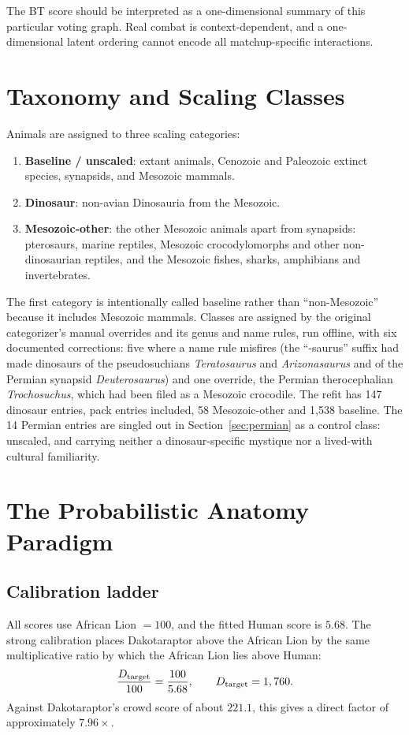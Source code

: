 \documentclass[11pt]{article}
\begin{document}
The BT score should be interpreted as a one-dimensional summary of this particular voting graph. Real combat is context-dependent, and a one-dimensional latent ordering cannot encode all matchup-specific interactions.

\section{Taxonomy and Scaling Classes}
\label{sec:classify}

Animals are assigned to three scaling categories:
\begin{enumerate}
\item \textbf{Baseline / unscaled}: extant animals, Cenozoic and Paleozoic extinct species, synapsids, and Mesozoic mammals.
\item \textbf{Dinosaur}: non-avian Dinosauria from the Mesozoic.
\item \textbf{Mesozoic-other}: the other Mesozoic animals apart from synapsids: pterosaurs, marine reptiles, Mesozoic crocodylomorphs and other non-dinosaurian reptiles, and the Mesozoic fishes, sharks, amphibians and invertebrates.
\end{enumerate}
The first category is intentionally called baseline rather than ``non-Mesozoic'' because it includes Mesozoic mammals. Classes are assigned by the original categorizer's manual overrides and its genus and name rules, run offline, with six documented corrections: five where a name rule misfires (the ``-saurus'' suffix had made dinosaurs of the pseudosuchians \textit{Teratosaurus} and \textit{Arizonasaurus} and of the Permian synapsid \textit{Deuterosaurus}) and one override, the Permian therocephalian \textit{Trochosuchus}, which had been filed as a Mesozoic crocodile. The refit has 147 dinosaur entries, pack entries included, 58 Mesozoic-other and 1,538 baseline. The 14 Permian entries are singled out in Section~\ref{sec:permian} as a control class: unscaled, and carrying neither a dinosaur-specific mystique nor a lived-with cultural familiarity.

\section{The Probabilistic Anatomy Paradigm}
\label{sec:rescale}

\subsection{Calibration ladder}
All scores use African Lion $=100$, and the fitted Human score is $5.68$. The strong calibration places Dakotaraptor above the African Lion by the same multiplicative ratio by which the African Lion lies above Human:
\[
\frac{D_{\rm target}}{100}=\frac{100}{5.68},
\qquad D_{\rm target}=1,760.
\]
Against Dakotaraptor's crowd score of about $221.1$, this gives a direct factor of approximately $7.96\times$.
\end{document}
